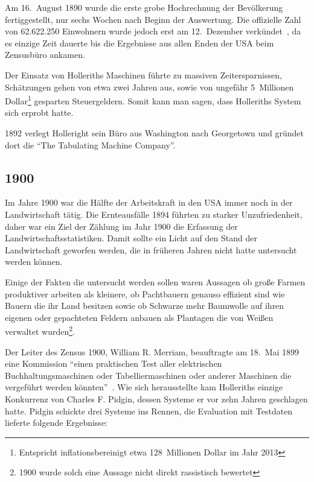 \documentclass[parskip=half]{scrartcl}
\begin{document}
Am 16.~August 1890 wurde die erste grobe Hochrechnung der Bevölkerung
fertiggestellt, nur sechs Wochen nach Beginn der Auswertung. Die offizielle
Zahl von 62.622.250 Einwohnern wurde jedoch erst am 12.~Dezember
verkündet~\cite{austrian1982herman}, da es einzige Zeit dauerte bis die
Ergebnisse aus allen Enden der USA beim Zensusbüro ankamen.

Der Einsatz von Holleriths Maschinen führte zu massiven Zeitersparnissen,
Schätzungen gehen von etwa zwei Jahren aus, sowie von ungefähr 5~Millionen
Dollar\footnote{Entspricht inflationsbereinigt etwa 128~Millionen Dollar im
Jahr 2013} gesparten Steuergeldern. Somit kann man sagen, dass Holleriths
System sich erprobt hatte.

1892 verlegt Holleright sein Büro aus Washington nach Georgetown und gründet
dort die \enquote{The Tabulating Machine Company}.


\subsection{1900}
\label{sec:1900}

Im Jahre 1900 war die Hälfte der Arbeitskraft in den USA immer noch in der
Landwirtschaft tätig. Die Ernteausfälle 1894 führten zu starker
Unzufriedenheit, daher war ein Ziel der Zählung im Jahr 1900 die Erfassung der
Landwirtschaftsstatistiken. Damit sollte ein Licht auf den Stand der
Landwirtschaft geworfen werden, die in früheren Jahren nicht hatte untersucht
werden können.

Einige der Fakten die untersucht werden sollen waren Aussagen ob große Farmen
produktiver arbeiten als kleinere, ob Pachtbauern genauso effizient sind wie
Bauern die ihr Land besitzen sowie ob Schwarze mehr Baumwolle auf ihren eigenen
oder gepachteten Feldern anbauen als Plantagen die von Weißen verwaltet
wurden\footnote{1900 wurde solch eine Aussage nicht direkt rassistisch
bewertet}.

Der Leiter des Zensus 1900, William R. Merriam, beauftragte am 18.~Mai 1899
eine Kommission \enquote{einen praktischen Test aller elektrischen
Buchhaltungsmaschinen oder Tabelliermaschinen oder anderer Maschinen die
vergeführt werden könnten}~\cite{austrian1982herman}. Wie sich herausstellte
kam Holleriths einzige Konkurrenz von Charles F. Pidgin, dessen Systeme er vor
zehn Jahren geschlagen hatte. Pidgin schickte drei Systeme ins Rennen, die
Evaluation mit Testdaten lieferte folgende Ergebnisse:
\end{document}
